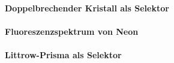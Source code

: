 \documentclass[../main.tex]{subfiles}
\begin{document}
\paragraph{Doppelbrechender Kristall als Selektor}

\paragraph{Fluoreszenzspektrum von Neon}

\paragraph{Littrow-Prisma als Selektor}
\end{document}

